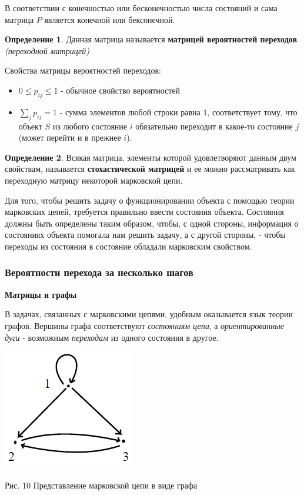 \documentclass[aps,%
12pt,%
final,%
oneside,
onecolumn,%
musixtex, %
superscriptaddress,%
centertags]{article} %
\theoremstyle{plain}
\theoremstyle{definition}
\newtheorem{definition}{Определение}[subsection]
\theoremstyle{remark}
\begin{document}
В соответствии с конечностью или бесконечностью числа состояний и сама матрица $P$ является конечной или бексонечной.

\begin{definition}
	Данная матрица называется \textbf{матрицей вероятностей переходов} \textit{(переходной матрицей)}
\end{definition}

Свойства матрицы вероятностей переходов:

\begin{itemize}
	\item $0 \leq p_{ij} \leq 1$ - обычное свойство вероятностей
	\item $\sum\limits_j p_{ij} = 1$ - сумма элементов любой строки равна $1$, соответствует тому, что объект $S$ из любого состояние $i$ обязательно переходит в какое-то состояние $j$ (может перейти и в прежнее $i$).
\end{itemize}

\begin{definition}
	Всякая матрица, элементы которой удовлетворяют данным двум свойствам, называется \textbf{стохастической матрицей} и ее можно рассматривать как переходную матрицу некоторой марковской цепи.
\end{definition}

Для того, чтобы решить задачу о функционировании объекта с
помощью теории марковских цепей, требуется правильно ввести
состояния объекта. Состояния должны быть определены таким образом,
чтобы, с одной стороны, информация о состояниях объекта помогала нам
решить задачу, а с другой стороны, - чтобы переходы из состояния в
состояние обладали марковским свойством.


\subsubsection{Вероятности перехода за несколько шагов}

\textbf{Матрицы и графы}

В задачах, связанных с марковскими цепями, удобным оказывается язык
теории графов. Вершины графа соответствуют \textit{состояниям цепи}, а
\textit{ориентированные дуги} - возможным \textit{переходам} из одного состояния в
другое. 

\begin{center}
  \includegraphics[scale=0.6]{images/10.png}

  Рис. 10 Представление марковской цепи в виде графа
\end{center}
\end{document}
